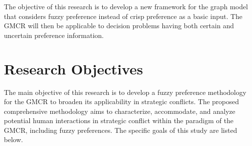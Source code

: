 The objective of this research is to develop a new framework for the graph model that considers fuzzy preference instead of crisp preference as a basic input. The GMCR will then be applicable to decision problems having both certain and uncertain preference information.

\section{Research Objectives}

The main objective of this research is to develop a fuzzy preference methodology for the GMCR to broaden its applicability in strategic conflicts. The proposed comprehensive methodology aims to characterize, accommodate, and analyze potential human interactions in strategic conflict within the paradigm of the GMCR, including fuzzy preferences. The specific goals of this study are listed below.

